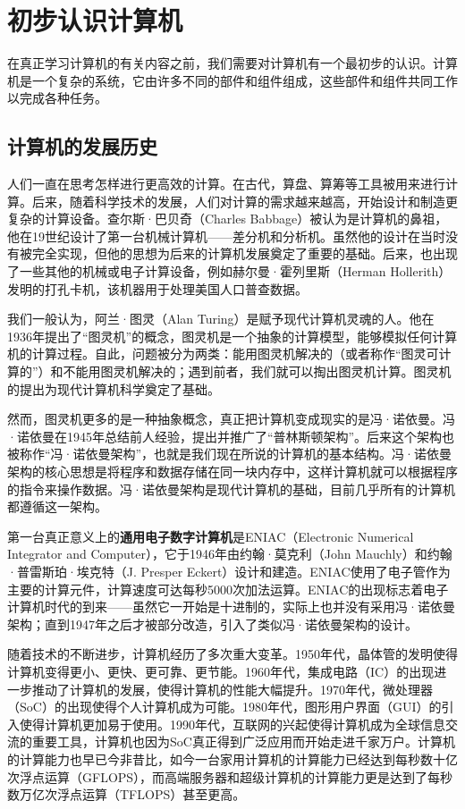 \chapter{初步认识计算机}

在真正学习计算机的有关内容之前，我们需要对计算机有一个最初步的认识。计算机是一个复杂的系统，它由许多不同的部件和组件组成，这些部件和组件共同工作以完成各种任务。

\section{计算机的发展历史}

人们一直在思考怎样进行更高效的计算。在古代，算盘、算筹等工具被用来进行计算。后来，随着科学技术的发展，人们对计算的需求越来越高，开始设计和制造更复杂的计算设备。查尔斯·巴贝奇（Charles Babbage）被认为是计算机的鼻祖，他在19世纪设计了第一台机械计算机——差分机和分析机。虽然他的设计在当时没有被完全实现，但他的思想为后来的计算机发展奠定了重要的基础。后来，也出现了一些其他的机械或电子计算设备，例如赫尔曼·霍列里斯（Herman Hollerith）发明的打孔卡机，该机器用于处理美国人口普查数据。

我们一般认为，阿兰·图灵（Alan Turing）是赋予现代计算机灵魂的人。他在1936年提出了“图灵机”的概念，图灵机是一个抽象的计算模型，能够模拟任何计算机的计算过程。自此，问题被分为两类：能用图灵机解决的（或者称作“图灵可计算的”）和不能用图灵机解决的；遇到前者，我们就可以掏出图灵机计算。图灵机的提出为现代计算机科学奠定了基础。

然而，图灵机更多的是一种抽象概念，真正把计算机变成现实的是冯·诺依曼。冯·诺依曼在1945年总结前人经验，提出并推广了“普林斯顿架构”。后来这个架构也被称作“冯·诺依曼架构”，也就是我们现在所说的计算机的基本结构。冯·诺依曼架构的核心思想是将程序和数据存储在同一块内存中，这样计算机就可以根据程序的指令来操作数据。冯·诺依曼架构是现代计算机的基础，目前几乎所有的计算机都遵循这一架构。

第一台真正意义上的\textbf{通用电子数字计算机}是ENIAC（Electronic Numerical Integrator and Computer），它于1946年由约翰·莫克利（John Mauchly）和约翰·普雷斯珀·埃克特（J. Presper Eckert）设计和建造。ENIAC使用了电子管作为主要的计算元件，计算速度可达每秒5000次加法运算。ENIAC的出现标志着电子计算机时代的到来——虽然它一开始是十进制的，实际上也并没有采用冯·诺依曼架构；直到1947年之后才被部分改造，引入了类似冯·诺依曼架构的设计。

随着技术的不断进步，计算机经历了多次重大变革。1950年代，晶体管的发明使得计算机变得更小、更快、更可靠、更节能。1960年代，集成电路（IC）的出现进一步推动了计算机的发展，使得计算机的性能大幅提升。1970年代，微处理器（SoC）的出现使得个人计算机成为可能。1980年代，图形用户界面（GUI）的引入使得计算机更加易于使用。1990年代，互联网的兴起使得计算机成为全球信息交流的重要工具，计算机也因为SoC真正得到广泛应用而开始走进千家万户。计算机的计算能力也早已今非昔比，如今一台家用计算机的计算能力已经达到每秒数十亿次浮点运算（GFLOPS），而高端服务器和超级计算机的计算能力更是达到了每秒数万亿次浮点运算（TFLOPS）甚至更高。

